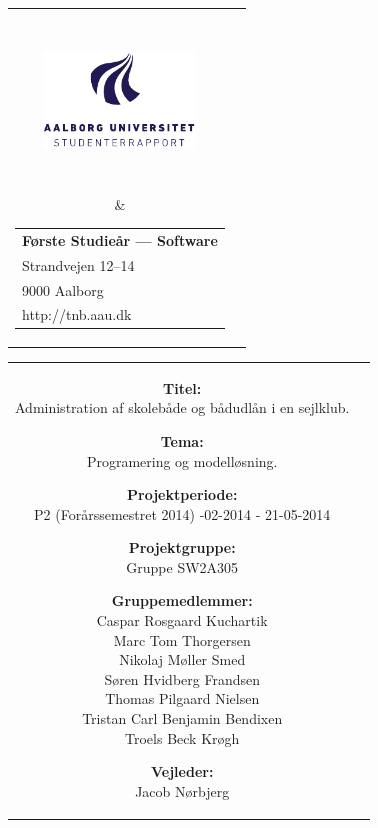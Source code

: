 \thispagestyle{empty}
\enlargethispage*{\ifcounts 4\else 2\fi\baselineskip}
{\samepage
\begin{tabular}{cc}
  \parbox{0.5\textwidth}{ %
    \hspace*{1cm} %
    \includegraphics[width=4cm,height=4cm,keepaspectratio]{images/aau_logo_da.pdf}} &
  \parbox{0.5\textwidth}{\begin{tabular}{l}
      {\small \textbf{Første Studieår --- Software}}\\
      {\small Strandvejen 12--14} \\
      {\small 9000 Aalborg} \\
      {\small http://tnb.aau.dk}
    \end{tabular}}
\end{tabular}

\begin{tabular}{cc}
  \parbox{8cm}{
  \begin{description}
    \item { \textbf{Titel:}}\\ 
      Administration af skolebåde og bådudlån i en sejlklub.
    \item { \textbf{Tema:}}\\ 
      Programering og modelløsning. 
  \end{description}
  
  \parbox{8cm}{
  \begin{description}
    \item { \textbf{Projektperiode:}}\\
      P2 (Forårssemestret 2014) -02-2014 - 21-05-2014
    \hspace{4cm}
    \item { \textbf{Projektgruppe:}}\\
        Gruppe SW2A305
    \hspace{4cm}
    \item {\textbf{Gruppemedlemmer:}}\\
      Caspar Rosgaard Kuchartik\\
      Marc Tom Thorgersen\\
      Nikolaj Møller Smed\\
      Søren Hvidberg Frandsen\\
      Thomas Pilgaard Nielsen\\
      Tristan Carl Benjamin Bendixen\\
      Troels Beck Krøgh\\
    \hspace{2cm}
    \item { \textbf{Vejleder:}}\\
      Jacob Nørbjerg\\
    \end{description}
  }

}
\end{tabular}}
